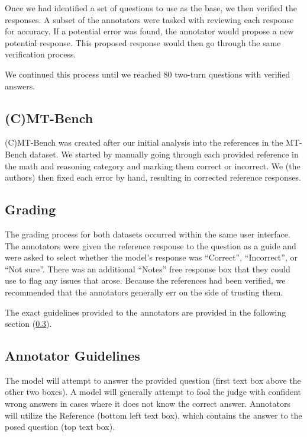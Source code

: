 Once we had identified a set of questions to use as the base, we then verified the responses. A subset of the annotators were tasked with reviewing each response for accuracy. If a potential error was found, the annotator would propose a new potential response. This proposed response would then go through the same verification process.

We continued this process until we reached 80 two-turn questions with verified answers.

\subsection{(C)MT-Bench}

(C)MT-Bench was created after our initial analysis into the references in the MT-Bench dataset. We started by manually going through each provided reference in the math and reasoning category and marking them correct or incorrect. We (the authors) then fixed each error by hand, resulting in corrected reference responses.

\subsection{Grading}

The grading process for both datasets occurred within the same user interface. The annotators were given the reference response to the question as a guide and were asked to select whether the model's response was ``Correct'', ``Incorrect'', or ``Not sure''. There was an additional ``Notes'' free response box that they could use to flag any issues that arose. Because the references had been verified, we recommended that the annotators generally err on the side of trusting them. 

The exact guidelines provided to the annotators are provided in the following section (\cref{sec:annotatorguidelines}).

\subsection{Annotator Guidelines}
\label{sec:annotatorguidelines}
The model will attempt to answer the provided question (first text box above the
other two boxes).  A model will generally attempt to fool the judge with
confident wrong answers in cases where it does not know the correct
answer. Annotators will utilize the Reference (bottom left text box), which
contains the answer to the posed question (top text box).

